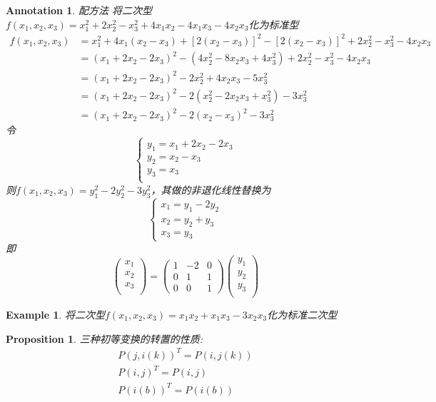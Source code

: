 \documentclass{article}
\newtheorem{proposition}[theorem]{Proposition}
\newtheorem{example}[theorem]{Example}
\newtheorem{annotation}[theorem]{Annotation}
\begin{document}
\begin{annotation}
\rm {\color{red}配方法} 将二次型$f(x_1,x_2,x_3)=x_1^2 +2x_2 ^2 -x_3^2 + 4x_1x_2 - 4x_1x_3-4x_2x_3$化为标准型
$$
\begin{array}{ll}
f(x_1,x_2,x_3) &= x_1 ^2 + 4x_1(x_2 - x_3) + [2(x_2 - x_3)]^2 - [2(x_2 - x_3)]^2 + 2x_2^2 - x_3^2-4x_2x_3\\
&= (x_1 + 2x_2 - 2x_3)^2 - (4x_2^2 - 8x_2x_3 + 4x_3^2) + 2x_2^2 - x_3^2 -4x_2x_3 \\ 
&= (x_1 + 2x_2 - 2x_3)^2 - 2x_2^2 + 4x_2x_3 -5x_3^2 \\
&= (x_1 + 2x_2 - 2x_3)^2 - 2(x_2^2 -2x_2x_3 + x_3^2) -3x_3^2 \\
&= (x_1 + 2x_2 - 2x_3)^2 - 2(x_2-x_3)^2 - 3x_3^2
\end{array}
$$
令
$$
\left\{ \begin{array}{ll}
y_1 = x_1 + 2x_2 - 2x_3 \\
y_2 = x_2 -x_3\\
y_3 = x_3 \\
\end{array}\right.
$$
则$f(x_1,x_2,x_3) = y_1^2 - 2y_2^2 - 3y_3^2$，其做的非退化线性替换为
$$
\left\{
\begin{array}{ll}
x_1 = y_1-2y_2 \\
x_2 = y_2 + y_3\\
x_3 = y_3
\end{array}\right.
$$
即
$$
\begin{pmatrix}
x_1 \\
x_2 \\
x_3 \\
\end{pmatrix} = 
\begin{pmatrix}
1 & -2 & 0\\
0 & 1 & 1\\
0 & 0 & 1 
\end{pmatrix}
\begin{pmatrix}
y_1 \\
y_2 \\
y_3 \\
\end{pmatrix}
$$
\end{annotation}

\begin{example}
\rm 将二次型$f(x_1,x_2,x_3) = x_1x_2 +x_1x_3 - 3x_2x_3$化为标准二次型
\end{example}

\begin{proposition}
\rm 三种初等变换的转置的性质: 
$$
\begin{array}{ll}
P(j,i(k))^T = P(i,j(k)) \\
P(i,j)^T = P(i,j) \\
P(i(b))^T = P(i(b)) 
\end{array}
$$
\end{proposition}
\end{document}

